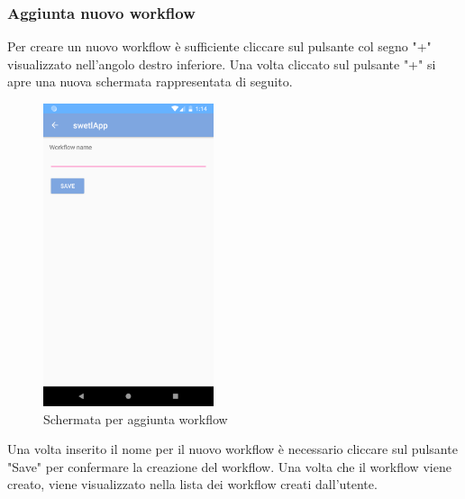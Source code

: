 \subsubsection{Aggiunta nuovo workflow}
\label{sec:sec_aggiunta_nuovo_workflow}
Per creare un nuovo workflow è sufficiente cliccare sul pulsante col segno "+" visualizzato nell'angolo destro inferiore.
Una volta cliccato sul pulsante "+" si apre una nuova schermata rappresentata di seguito.
\begin{figure}[H]
	\centering
	\includegraphics[width=5cm]{../includes/pics/add_workflow.png}
	\caption{\label{fig:add_workflow}Schermata per aggiunta workflow}
\end{figure}
Una volta inserito il nome per il nuovo workflow è necessario cliccare sul pulsante "Save" per confermare la creazione del workflow. Una volta che il workflow viene creato, viene visualizzato nella lista dei workflow creati dall'utente.
\pagebreak
